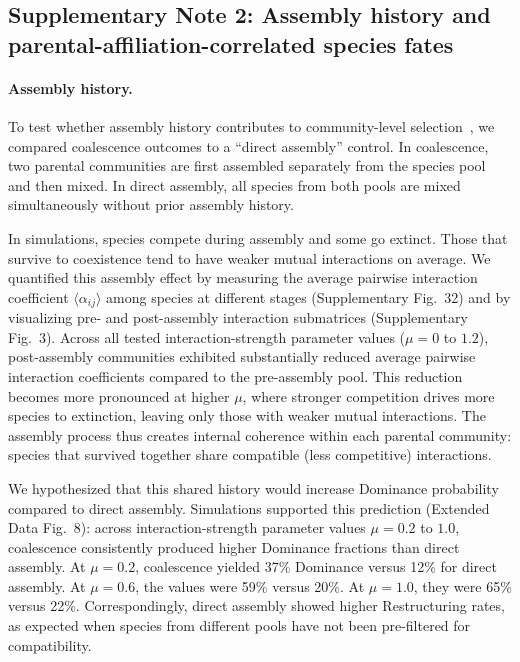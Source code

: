 \subsection*{Supplementary Note 2: Assembly history and parental-affiliation-correlated species fates}
\label{sec:suppl:note2}

\paragraph{Assembly history.}
To test whether assembly history contributes to community-level selection~\citep{Gilpin1994,Debray2022,Tikhonov2016,DiazColunga2022}, we compared coalescence outcomes to a ``direct assembly'' control. In coalescence, two parental communities are first assembled separately from the species pool and then mixed. In direct assembly, all species from both pools are mixed simultaneously without prior assembly history.

In simulations, species compete during assembly and some go extinct. Those that survive to coexistence tend to have weaker mutual interactions on average. We quantified this assembly effect by measuring the average pairwise interaction coefficient $\langle \alpha_{ij} \rangle$ among species at different stages (Supplementary Fig.~32) and by visualizing pre- and post-assembly interaction submatrices (Supplementary Fig.~3). Across all tested interaction-strength parameter values ($\mu = 0$ to $1.2$), post-assembly communities exhibited substantially reduced average pairwise interaction coefficients compared to the pre-assembly pool. This reduction becomes more pronounced at higher $\mu$, where stronger competition drives more species to extinction, leaving only those with weaker mutual interactions. The assembly process thus creates internal coherence within each parental community: species that survived together share compatible (less competitive) interactions.

We hypothesized that this shared history would increase Dominance probability compared to direct assembly. Simulations supported this prediction (Extended Data Fig.~8): across interaction-strength parameter values $\mu = 0.2$ to $1.0$, coalescence consistently produced higher Dominance fractions than direct assembly. At $\mu = 0.2$, coalescence yielded 37\% Dominance versus 12\% for direct assembly. At $\mu = 0.6$, the values were 59\% versus 20\%. At $\mu = 1.0$, they were 65\% versus 22\%. Correspondingly, direct assembly showed higher Restructuring rates, as expected when species from different pools have not been pre-filtered for compatibility.

